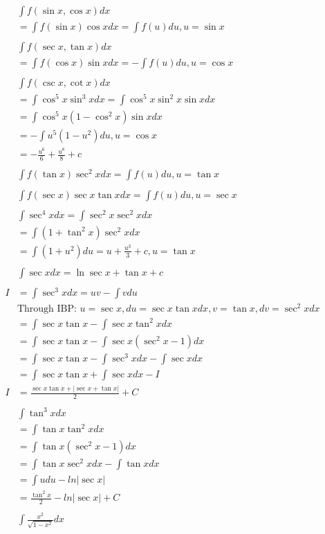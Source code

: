 \documentclass{article}
\begin{document}
\begin{align*}
    &\int f(\sin{x}, \cos{x}) dx \\
    &=\int f(\sin{x})\cos{x} dx = \int f(u) du, u = \sin{x} \\\\
    &\int f(\sec{x}, \tan{x}) dx \\
    &= \int f(\cos{x})\sin{x} dx = -\int f(u) du, u = \cos{x} \\\\ 
    &\int f(\csc{x}, \cot{x}) dx \\
    &= \int \cos^5{x}\sin^3{x}dx = \int \cos^5{x}\sin^2{x}\sin{x}dx \\
    &= \int \cos^5{x}(1-\cos^2{x})\sin{x} dx \\
    &= -\int u^5(1-u^2) du, u = \cos{x} \\
    &= -\frac{u^6}{6} + \frac{u^8}{8} + c \\\\
    &\int f(\tan{x})\sec^2{x} dx = \int f(u) du, u = \tan{x} \\\\
    &\int f(\sec{x})\sec{x}\tan{x} dx = \int f(u)du, u = \sec{x} \\\\
    &\int \sec^4{x}dx = \int \sec^2{x}\sec^2{x} dx \\
    &= \int (1+\tan^2{x}) \sec^2{x} dx \\
    &= \int (1+u^2)du = u+ \frac{u^3}{3} + c, u = \tan{x} \\\\
    &\int \sec{x} dx = \ln{\sec{x}+\tan{x}} + c \\\\
    I &= \int \sec^3{x} dx = uv - \int v du \\
    &\text{Through IBP: } u=\sec{x}, du=\sec{x}\tan{x}dx, v = \tan{x}, dv = \sec^2{x}dx \\
    &= \int \sec{x}\tan{x} - \int\sec{x}\tan^2{x} dx \\
    &= \int \sec{x}\tan{x} - \int\sec{x}(\sec^2{x}-1) dx \\
    &= \int \sec{x}\tan{x} - \int\sec^3{x} dx - \int \sec{x} dx \\
    &= \int \sec{x}\tan{x} + \int\sec{x}dx - I \\
    I &= \frac{\sec{x}\tan{x}+|\sec{x}+\tan{x}|}{2} + C\\\\
    &\int\tan^3{x} dx \\
    &= \int\tan{x}\tan^2{x} dx \\
    &= \int\tan{x}(\sec^2{x}-1) dx \\
    &= \int\tan{x}\sec^2{x} dx - \int\tan{x} dx \\
    &= \int u du - ln|\sec{x}| \\
    &= \frac{\tan^2{x}}{2} - ln|\sec{x}| + C \\\\
    &\int \frac{x^2}{\sqrt{1-x^2}} dx \\
\end{align*}
\end{document}
